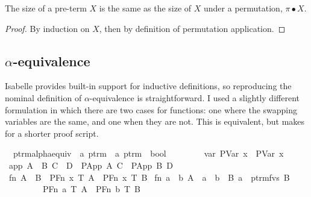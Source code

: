 \begin{lemma}
The size of a pre-term \(X\) is the same as the size of \(X\) under a permutation, \(\pi \bullet X\).
\end{lemma}
\begin{proof}
By induction on \(X\), then by definition of permutation application.
\end{proof}

\subsection{\(\alpha\)-equivalence}
Isabelle provides built-in support for inductive definitions, so reproducing the nominal definition of \(\alpha\)-equivalence is straightforward.
I used a slightly different formulation in which there are two cases for functions: one where the swapping variables are the same, and one when they are not.
This is equivalent, but makes for a shorter proof script.

\begin{implementation}
\isamarkupfalse%
\isanewline
\ \ ptrm{\isacharunderscore}alpha{\isacharunderscore}equiv\ {\isacharcolon}{\isacharcolon}\ {\isachardoublequoteopen}{\isacharprime}a\ ptrm\ {\isasymRightarrow}\ {\isacharprime}a\ ptrm\ {\isasymRightarrow}\ bool{\isachardoublequoteclose}\ {
\isacharparenleft}\ {\isachardoublequoteopen}{\isasymapprox}{\isachardoublequoteclose}\ {}{}{}{\isacharparenright}\isanewline
\ \ \isanewline
\ \ var{\isacharcolon}\ {\isachardoublequoteopen}{\isacharparenleft}PVar\ x{\isacharparenright}\ {\isasymapprox}\ {\isacharparenleft}PVar\ x{\isacharparenright}{\isachardoublequoteclose}\isanewline
{\isacharbar}\ app{\isacharcolon}\ {\isachardoublequoteopen}{\isasymlbrakk}A\ {\isasymapprox}\ B{\isacharsemicolon}\ C\ {\isasymapprox}\ D{\isasymrbrakk}\ {\isasymLongrightarrow}\ {\isacharparenleft}PApp\ A\ C{\isacharparenright}\ {\isasymapprox}\ {\isacharparenleft}PApp\ B\ D{\isacharparenright}{\isachardoublequoteclose}\isanewline
{\isacharbar}\ fn{}{\isacharcolon}\ {\isachardoublequoteopen}A\ {\isasymapprox}\ B\ {\isasymLongrightarrow}\ {\isacharparenleft}PFn\ x\ T\ A{\isacharparenright}\ {\isasymapprox}\ {\isacharparenleft}PFn\ x\ T\ B{\isacharparenright}{\isachardoublequoteclose}\isanewline
{\isacharbar}\ fn{}{\isacharcolon}\ {\isachardoublequoteopen}{\isasymlbrakk}a\ {\isasymnoteq}\ b{\isacharsemicolon}\ A\ {\isasymapprox}\ {\isacharbrackleft}a\ {\isasymleftrightarrow}\ b{\isacharbrackright}\ {\isasymbullet}\ B{\isacharsemicolon}\ a\ {\isasymnotin}\ ptrm{\isacharunderscore}fvs\ B{\isasymrbrakk}\isanewline
\ \ \ \ \ \ \ \ {\isasymLongrightarrow}\ {\isacharparenleft}PFn\ a\ T\ A{\isacharparenright}\ {\isasymapprox}\ {\isacharparenleft}PFn\ b\ T\ B{\isacharparenright}{\isachardoublequoteclose}\isanewline
\end{implementation}

